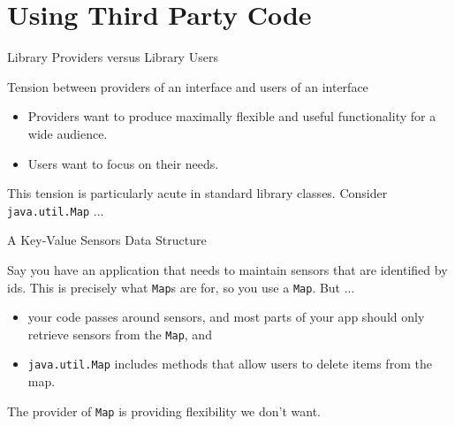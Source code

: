 \documentclass{beamer}
\author[Chris Simpkins] 
{Christopher Simpkins \\\texttt{chris.simpkins@gatech.edu}}
\institute[Georgia Tech] %
\date[CS 1331]{}
\begin{document}
\begin{frame}
  \titlepage
\end{frame}

\section{Using Third Party Code}

\begin{frame}[fragile]{Library Providers versus Library Users}


Tension between providers of an interface and users of an interface
\begin{itemize}
\item Providers want to produce maximally flexible and useful functionality for a wide audience.
\item Users want to focus on their needs.
\end{itemize}

This tension is particularly acute in standard library classes.  Consider {\tt java.util.Map} ...

\end{frame}

\begin{frame}[fragile]{A Key-Value Sensors Data Structure}


Say you have an application that needs to maintain sensors that are identified by ids.  This is precisely what {\tt Map}s are for, so you use a {\tt Map}.  But ...

\begin{itemize}
\item your code passes around sensors, and most parts of your app should only retrieve sensors from the {\tt Map}, and
\item {\tt java.util.Map} includes methods that allow users to delete items from the map.
\end{itemize}

The provider of {\tt Map} is providing flexibility we don't want.

\end{frame}
\end{document}

